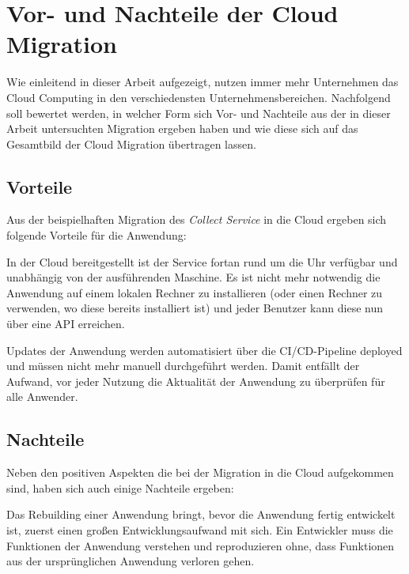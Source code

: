 \section{Vor- und Nachteile der Cloud Migration}
Wie einleitend in dieser Arbeit aufgezeigt, nutzen immer mehr Unternehmen das Cloud Computing in den verschiedensten Unternehmensbereichen. Nachfolgend soll bewertet werden, in welcher Form sich Vor- und Nachteile aus der in dieser Arbeit untersuchten Migration ergeben haben und wie diese sich auf das Gesamtbild der Cloud Migration übertragen lassen.

\subsection{Vorteile}
Aus der beispielhaften Migration des \textit{Collect Service} in die Cloud ergeben sich folgende Vorteile für die Anwendung:

In der Cloud bereitgestellt ist der Service fortan rund um die Uhr verfügbar und unabhängig von der ausführenden Maschine. Es ist nicht mehr notwendig die Anwendung auf einem lokalen Rechner zu installieren (oder einen Rechner zu verwenden, wo diese bereits installiert ist) und jeder Benutzer kann diese nun über eine \ac{API} erreichen.

Updates der Anwendung werden automatisiert über die \ac{CI/CD}-Pipeline deployed und müssen nicht mehr manuell durchgeführt werden. Damit entfällt der Aufwand, vor jeder Nutzung die Aktualität der Anwendung zu überprüfen für alle Anwender. \pagebreak

\subsection{Nachteile}
Neben den positiven Aspekten die bei der Migration in die Cloud aufgekommen sind, haben sich auch einige Nachteile ergeben:

Das Rebuilding einer Anwendung bringt, bevor die Anwendung fertig entwickelt ist, zuerst einen großen Entwicklungsaufwand mit sich. Ein Entwickler muss die Funktionen der Anwendung verstehen und reproduzieren ohne, dass Funktionen aus der ursprünglichen Anwendung verloren gehen.
\pagebreak